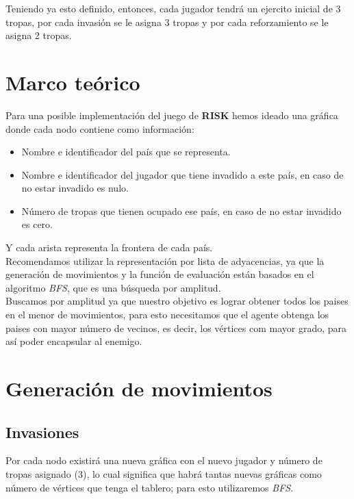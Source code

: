 \documentclass[12pt]{article}
\begin{document}
Teniendo ya esto definido, entonces, cada jugador tendr\'a un ejercito inicial de 3 tropas, por cada invasi\'on
se le asigna 3 tropas y por cada reforzamiento se le asigna 2 tropas.


\section{Marco te\'orico}

Para una posible implementaci\'on del juego de \textbf{RISK} hemos ideado una gr\'afica donde cada nodo
contiene como informaci\'on:
\begin{itemize}
 \item Nombre e identificador del pa\'is que se representa.
 \item Nombre e identificador del jugador que tiene invadido a este pa\'is, en caso de no estar invadido es nulo.
 \item N\'umero de tropas que tienen ocupado ese pa\'is, en caso de no estar invadido es cero.
\end{itemize}
Y cada arista representa la frontera de cada pa\'is.\\
Recomendamos utilizar la representaci\'on por lista de adyacencias, ya que la generaci\'on de movimientos y
la funci\'on de evaluaci\'on est\'an basados en el algoritmo \textit{BFS}, que es una b\'usqueda por amplitud.\\
Buscamos por amplitud ya que nuestro objetivo es lograr obtener todos los paises en el menor de movimientos, 
para esto necesitamos que el agente obtenga los paises con mayor n\'umero de vecinos, es decir, los v\'ertices
com mayor grado, para as\'i poder encapsular al enemigo.

\section{Generaci\'on de movimientos}

\subsection{Invasiones}

Por cada nodo existir\'a una nueva gr\'afica con el nuevo jugador y n\'umero de tropas asignado (3), lo
cual significa que habr\'a tantas nuevas gr\'aficas como n\'umero de v\'ertices que tenga el tablero; para
esto utilizaremos \textit{BFS}.
\end{document}
